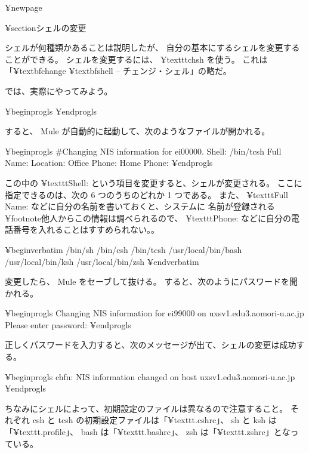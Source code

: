 ¥newpage

¥section{シェルの変更}

シェルが何種類かあることは説明したが、
自分の基本にするシェルを変更することができる。
シェルを変更するには、 ¥texttt{chsh} を使う。
これは「¥textbf{ch}ange ¥textbf{sh}ell -- チェンジ・シェル」の略だ。

では、実際にやってみよう。

¥begin{progls}
¥end{progls}

すると、 Mule が自動的に起動して、次のようなファイルが開かれる。

¥begin{progls}
#Changing NIS information for ei00000.
Shell: /bin/tcsh
Full Name:
Location: 
Office Phone: 
Home Phone: 
¥end{progls}

この中の ¥texttt{Shell:} という項目を変更すると、シェルが変更される。
ここに指定できるのは、次の 6 つのうちのどれか 1 つである。
また、 ¥texttt{Full Name:} などに自分の名前を書いておくと、システムに
名前が登録される¥footnote{他人からこの情報は調べられるので、
 ¥texttt{Phone:} などに自分の電話番号を入れることはすすめられない。}。

¥begin{verbatim}
/bin/sh
/bin/csh
/bin/tcsh
/usr/local/bin/bash
/usr/local/bin/ksh
/usr/local/bin/zsh
¥end{verbatim}

変更したら、 Mule をセーブして抜ける。
すると、次のようにパスワードを聞かれる。

¥begin{progls}
Changing NIS information for ei99000 on uxsv1.edu3.aomori-u.ac.jp
Please enter password: 
¥end{progls}

正しくパスワードを入力すると、次のメッセージが出て、シェルの変更は成功する。

¥begin{progls}
chfn: NIS information changed on host uxsv1.edu3.aomori-u.ac.jp
¥end{progls}

ちなみにシェルによって、初期設定のファイルは異なるので注意すること。
それぞれ csh と tcsh の初期設定ファイルは「¥texttt{.cshrc}」、
sh と ksh は「¥texttt{.profile}」、
bash は「¥texttt{.bashrc}」、
zsh は「¥texttt{.zshrc}」となっている。

